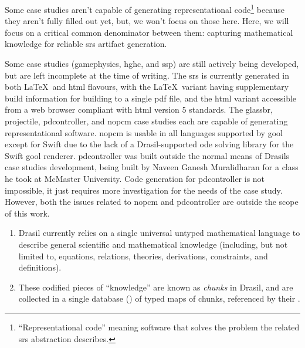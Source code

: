 \caseStudiesCodeTable{}

Some case studies aren't capable of generating representational
code\footnote{``Representational code'' meaning software that solves the problem
      the related \acs{srs} abstraction describes.} because they aren't fully filled
out yet, but, we won't focus on those here. Here, we will focus on a critical
common denominator between them: capturing mathematical knowledge for reliable
\acs{srs} artifact generation.


Some case studies (\acs{gamephysics}, \acs{hghc}, and \acs{ssp}) are still
actively being developed, but are left incomplete at the time of writing. The
\acs{srs} is currently generated in both \LaTeX{}\ and \acs{html} flavours, with
the \LaTeX{}\ variant having supplementary build information for building to a
single \acs{pdf} file, and the \acs{html} variant accessible from a web browser
compliant with \acs{html} version 5 standards. The \acs{glassbr},
\acs{projectile}, \acs{pdcontroller}, and \acs{nopcm} case studies each are
capable of generating representational software. \acs{nopcm} is usable in all
languages supported by \acs{gool} except for Swift due to the lack of a
Drasil-supported \acs{ode} solving library for the Swift \acs{gool} renderer.
\acs{pdcontroller} was built outside the normal means of Drasils case studies
development, being built by Naveen Ganesh Muralidharan \cite{DrasilPR2289Naveen}
for a class he took at McMaster University. Code generation for
\acs{pdcontroller} is not impossible, it just requires more investigation for
the needs of the case study. However, both the issues related to \acs{nopcm} and
\acs{pdcontroller} are outside the scope of this work.

\begin{enumerate}

      \item Drasil currently relies on a single universal untyped mathematical
            language to describe general scientific and mathematical knowledge
            (including, but not limited to, equations, relations, theories,
            derivations, constraints, and definitions).

      \item These codified pieces of ``knowledge'' are known as \textit{chunks}
            in Drasil, and are collected in a single database
            () of typed maps of chunks, referenced by
            their .

\end{enumerate}

